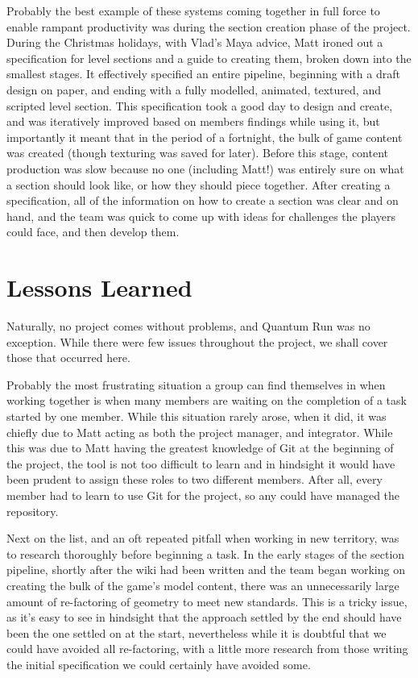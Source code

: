 \documentclass[a4paper,oneside]{memoir}
\begin{document}
			Probably the best example of these systems coming together in full force to enable rampant productivity was during the section creation phase of the project. 
			During the Christmas holidays, with Vlad's Maya advice, Matt ironed out a specification for level sections and a guide to creating them, broken down into the smallest stages. 
			It effectively specified an entire pipeline, beginning with a draft design on paper, and ending with a fully modelled, animated, textured, and scripted level section. 
			This specification took a good day to design and create, and was iteratively improved based on members findings while using it, but importantly it meant that in the period of a fortnight, the bulk of game content was created (though texturing was saved for later).
			Before this stage, content production was slow because no one (including Matt!) was entirely sure on what a section should look like, or how they should piece together.
			After creating a specification, all of the information on how to create a section was clear and on hand, and the team was quick to come up with ideas for challenges the players could face, and then develop them.

		\section{Lessons Learned}

			Naturally, no project comes without problems, and Quantum Run was no exception. While there were few issues throughout the project, we shall cover those that occurred here.

			Probably the most frustrating situation a group can find themselves in when working together is when many members are waiting on the completion of a task started by one member. 
			While this situation rarely arose, when it did, it was chiefly due to Matt acting as both the project manager, and integrator. 
			While this was due to Matt having the greatest knowledge of Git at the beginning of the project, the tool is not too difficult to learn and in hindsight it would have been prudent to assign these roles to two different members.
			After all, every member had to learn to use Git for the project, so any could have managed the repository.

			Next on the list, and an oft repeated pitfall when working in new territory, was to research thoroughly before beginning a task. 
			In the early stages of the section pipeline, shortly after the wiki had been written and the team began working on creating the bulk of the game's model content, there was an unnecessarily large amount of re-factoring of geometry to meet new standards. 
			This is a tricky issue, as it's easy to see in hindsight that the approach settled by the end should have been the one settled on at the start, nevertheless while it is doubtful that we could have avoided all re-factoring, with a little more research from those writing the initial specification we could certainly have avoided some.
\end{document}
